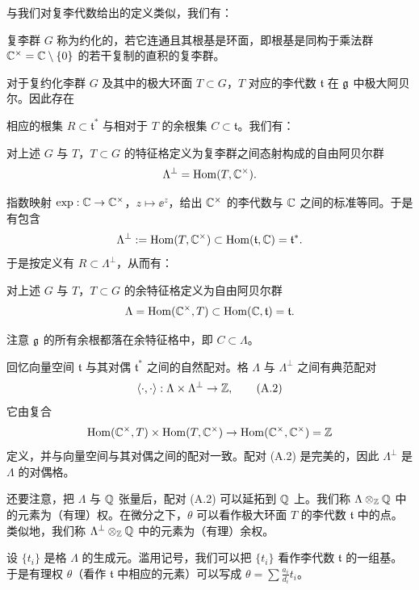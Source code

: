 与我们对复李代数给出的定义类似，我们有：

\begin{definition}[A.6] 复李群 $G$ 称为约化的，若它连通且其根基是环面，即根基是同构于乘法群 $\mathbb{C}^{\times}=\mathbb{C}\setminus\{0\}$ 的若干复制的直积的复李群。
\end{definition}

对于复约化李群 $G$ 及其中的极大环面 $T\subset G$，$T$ 对应的李代数 $\mathfrak{t}$ 在 $\mathfrak{g}$ 中极大阿贝尔。因此存在

相应的根集 $R\subset\mathfrak{t}^{*}$ 与相对于 $T$ 的余根集 $C\subset\mathfrak{t}$。我们有：

\begin{definition}[A.7] 对上述 $G$ 与 $T$，$T\subset G$ 的特征格定义为复李群之间态射构成的自由阿贝尔群
\[
\Lambda^{\perp}=\operatorname{Hom}(T,\mathbb{C}^{\times}).
\]
\end{definition}

指数映射 $\exp:\mathbb{C}\to\mathbb{C}^{\times}$，$z\mapsto\ee^z$，给出 $\mathbb{C}^{\times}$ 的李代数与 $\mathbb{C}$ 之间的标准等同。于是有包含
\[
\Lambda^{\perp}:=\operatorname{Hom}(T,\mathbb{C}^{\times})\subset\operatorname{Hom}(\mathfrak{t},\mathbb{C})=\mathfrak{t}^{*}.
\]
于是按定义有 $R\subset\Lambda^{\perp}$，从而有：

\begin{definition}[A.8] 对上述 $G$ 与 $T$，$T\subset G$ 的余特征格定义为自由阿贝尔群
\[
\Lambda=\operatorname{Hom}(\mathbb{C}^{\times},T)\subset\operatorname{Hom}(\mathbb{C},\mathfrak{t})=\mathfrak{t}.
\]
\end{definition}

注意 $\mathfrak{g}$ 的所有余根都落在余特征格中，即 $C\subset\Lambda$。

回忆向量空间 $\mathfrak{t}$ 与其对偶 $\mathfrak{t}^{*}$ 之间的自然配对。格 $\Lambda$ 与 $\Lambda^{\perp}$ 之间有典范配对
\begin{equation}
\langle\cdot,\cdot\rangle:\Lambda\times\Lambda^{\perp}\to\mathbb{Z}, \tag{A.2}
\end{equation}
它由复合
\[
\operatorname{Hom}(\mathbb{C}^{\times},T)\times\operatorname{Hom}(T,\mathbb{C}^{\times})\to\operatorname{Hom}(\mathbb{C}^{\times},\mathbb{C}^{\times})=\mathbb{Z}
\]
定义，并与向量空间与其对偶之间的配对一致。配对 (A.2) 是完美的，因此 $\Lambda^{\perp}$ 是 $\Lambda$ 的对偶格。

还要注意，把 $\Lambda$ 与 $\mathbb{Q}$ 张量后，配对 (A.2) 可以延拓到 $\mathbb{Q}$ 上。我们称 $\Lambda\otimes_{\mathbb{Z}}\mathbb{Q}$ 中的元素为（有理）权。在微分之下，$\theta$ 可以看作极大环面 $T$ 的李代数 $\mathfrak{t}$ 中的点。类似地，我们称 $\Lambda^{\perp}\otimes_{\mathbb{Z}}\mathbb{Q}$ 中的元素为（有理）余权。

\begin{remark}[A.9] 设 $\{t_i\}$ 是格 $\Lambda$ 的生成元。滥用记号，我们可以把 $\{t_i\}$ 看作李代数 $\mathfrak{t}$ 的一组基。于是有理权 $\theta$（看作 $\mathfrak{t}$ 中相应的元素）可以写成 $\theta=\sum\frac{a_i}{d_i}t_i$。
\end{remark}

